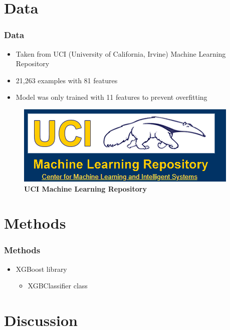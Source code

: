 \documentclass[12pt]{beamer}
\begin{document}
\section{Data}
\begin{frame}
\frametitle{Data}

\begin{itemize}
  \item Taken from UCI (University of California, Irvine) Machine Learning Repository
  \pause
  \item 21,263 examples with 81 features
  \pause
  \item Model was only trained with 11 features to prevent overfitting
  \pause
\end{itemize}

\begin{figure}[h]
  \includegraphics[scale = 0.5]{UCIRepo.png}
  \caption{\textbf{UCI Machine Learning Repository}}
\end{figure}

\end{frame}



\section{Methods}



\begin{frame}
\frametitle{Methods}

\pause
\begin{itemize}
  \item XGBoost library
  \begin{itemize}
    \pause
    \item XGBClassifier class
  \end{itemize}
\end{itemize}

\end{frame}



\section{Discussion}
\end{document}
